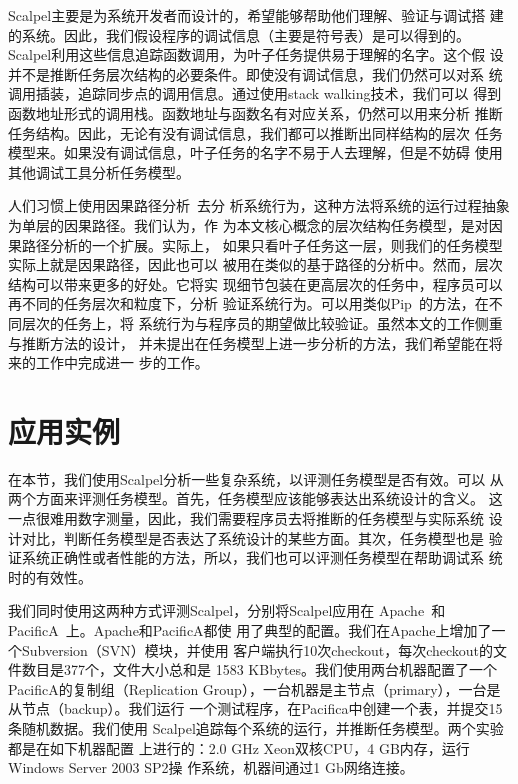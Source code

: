 Scalpel主要是为系统开发者而设计的，希望能够帮助他们理解、验证与调试搭
建的系统。因此，我们假设程序的调试信息（主要是符号表）是可以得到的。
Scalpel利用这些信息追踪函数调用，为叶子任务提供易于理解的名字。这个假
设并不是推断任务层次结构的必要条件。即使没有调试信息，我们仍然可以对系
统调用插装，追踪同步点的调用信息。通过使用stack walking技术，我们可以
得到函数地址形式的调用栈。函数地址与函数名有对应关系，仍然可以用来分析
推断任务结构。因此，无论有没有调试信息，我们都可以推断出同样结构的层次
任务模型来。如果没有调试信息，叶子任务的名字不易于人去理解，但是不妨碍
使用其他调试工具分析任务模型。

人们习惯上使用因果路径分析~\cite{pinpoint, project5, pip, magpie}去分
析系统行为，这种方法将系统的运行过程抽象为单层的因果路径。我们认为，作
为本文核心概念的层次结构任务模型，是对因果路径分析的一个扩展。实际上，
如果只看叶子任务这一层，则我们的任务模型实际上就是因果路径，因此也可以
被用在类似的基于路径的分析中。然而，层次结构可以带来更多的好处。它将实
现细节包装在更高层次的任务中，程序员可以再不同的任务层次和粒度下，分析
验证系统行为。可以用类似Pip~\cite{pip}的方法，在不同层次的任务上，将
系统行为与程序员的期望做比较验证。虽然本文的工作侧重与推断方法的设计，
并未提出在任务模型上进一步分析的方法，我们希望能在将来的工作中完成进一
步的工作。


\section{应用实例}

在本节，我们使用Scalpel分析一些复杂系统，以评测任务模型是否有效。可以
从两个方面来评测任务模型。首先，任务模型应该能够表达出系统设计的含义。
这一点很难用数字测量，因此，我们需要程序员去将推断的任务模型与实际系统
设计对比，判断任务模型是否表达了系统设计的某些方面。其次，任务模型也是
验证系统正确性或者性能的方法，所以，我们也可以评测任务模型在帮助调试系
统时的有效性。

我们同时使用这两种方式评测Scalpel，分别将Scalpel应用在
Apache~\cite{apache}和PacificA~\cite{pacifica}上。Apache和PacificA都使
用了典型的配置。我们在Apache上增加了一个Subversion（SVN）模块，并使用
客户端执行10次checkout，每次checkout的文件数目是377个，文件大小总和是
1583 KBbytes。我们使用两台机器配置了一个PacificA的复制组（Replication
Group），一台机器是主节点（primary），一台是从节点（backup）。我们运行
一个测试程序，在Pacifica中创建一个表，并提交15条随机数据。我们使用
Scalpel追踪每个系统的运行，并推断任务模型。两个实验都是在如下机器配置
上进行的：2.0 GHz Xeon双核CPU，4 GB内存，运行Windows Server 2003 SP2操
作系统，机器间通过1 Gb网络连接。

